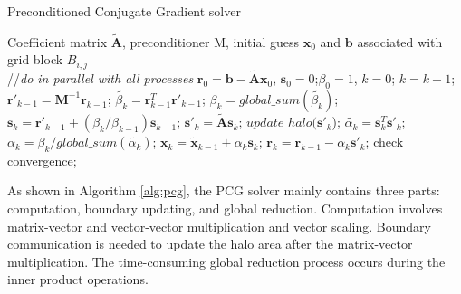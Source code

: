 \documentclass{sig-alternate}
\begin{document}
\begin{algorithm}[!t]
\caption{Preconditioned Conjugate Gradient solver}
\label{alg:pcg}
\begin{algorithmic}[1]
\REQUIRE Coefficient matrix $\tilde{\textbf{A}}$, preconditioner  M, initial guess $\textbf{x}_0$ and $\textbf{b}$ associated with grid block $B_{i,j}$ \\
//\qquad    \textit{do in parallel with all processes}
\STATE $\textbf{r}_0 = \textbf{b}-\tilde{\textbf{A}}\textbf{x}_0$, $\textbf{s}_0 =0$;\quad $\beta_0=1$, $k=0$;
\STATE $k=k+1$;
\STATE $\textbf{r}'_{k-1} =\textbf{M}^{-1}\textbf{r}_{k-1}$; \label{pcg_scale1} 
\STATE $\tilde{\beta_k} = \textbf{r}_{k-1}^T\textbf{r}'_{k-1}$;\label{pcg_dot1}
\STATE $\beta_k = global\_sum(\tilde{\beta_k})$;\label{pcg_global1} 
\STATE $\textbf{s}_k = \textbf{r}'_{k-1} +(\beta_k/\beta_{k-1})\textbf{s}_{k-1}$;\label{pcg_scale2}
\STATE $\textbf{s}'_k = \tilde{\textbf{A}}\textbf{s}_k$; \label{pcg_mat}
\STATE $update\_halo(\textbf{s}'_k$); 
\STATE $\tilde{\alpha_k} = \textbf{s}_k^T\textbf{s}'_k$;\label{pcg_dot2}
\STATE $\alpha_k =\beta_k/ global\_sum(\tilde{\alpha_k})$;\quad \label{pcg_global2}
\STATE $\textbf{x}_k =\tilde{\textbf{x}}_{k-1} +\alpha_k \textbf{s}_k$;\label{pcg_scale3}
\STATE $\textbf{r}_k =\textbf{r}_{k-1} -\alpha_k\textbf{s}'_k$;\label{pcg_scale4}
\STATE check convergence;
\ENDIF
\ENDWHILE
\end{algorithmic}
\end{algorithm}


As shown in Algorithm \ref{alg:pcg}, the PCG solver mainly contains three parts: computation, boundary updating, and global reduction. Computation involves matrix-vector and vector-vector multiplication and vector scaling.  Boundary communication is needed to update the halo area after the matrix-vector multiplication.  The time-consuming global reduction process occurs during the inner product operations.

\end{document}
